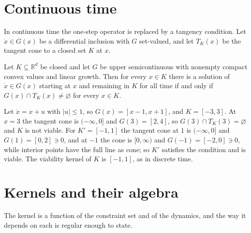 \section{Continuous time}

In continuous time the one-step operator is replaced by a tangency condition. Let $\dot x\in G(x)$ be a differential inclusion with $G$ set-valued, and let $T_K(x)$ be the tangent cone to a closed set $K$ at $x$.

\begin{established}\label{thm:aubin}
Let $K\subseteq\mathbb R^{d}$ be closed and let $G$ be upper semicontinuous with nonempty compact convex values and linear growth. Then for every $x\in K$ there is a solution of $\dot x\in G(x)$ starting at $x$ and remaining in $K$ for all time if and only if $G(x)\cap T_K(x)\ne\varnothing$ for every $x\in K$.
\end{established}

\begin{example}
Let $\dot x=x+u$ with $|u|\le1$, so $G(x)=[x-1,x+1]$, and $K=[-3,3]$. At $x=3$ the tangent cone is $(-\infty,0]$ and $G(3)=[2,4]$, so $G(3)\cap T_K(3)=\varnothing$ and $K$ is not viable. For $K'=[-1,1]$ the tangent cone at $1$ is $(-\infty,0]$ and $G(1)=[0,2]\ni0$, and at $-1$ the cone is $[0,\infty)$ and $G(-1)=[-2,0]\ni0$, while interior points have the full line as cone; so $K'$ satisfies the condition and is viable. The viability kernel of $K$ is $[-1,1]$, as in discrete time.
\end{example}


\section{Kernels and their algebra}\label{sec:kernel-algebra}

The kernel is a function of the constraint set and of the dynamics, and the way it depends on each is regular enough to state.

